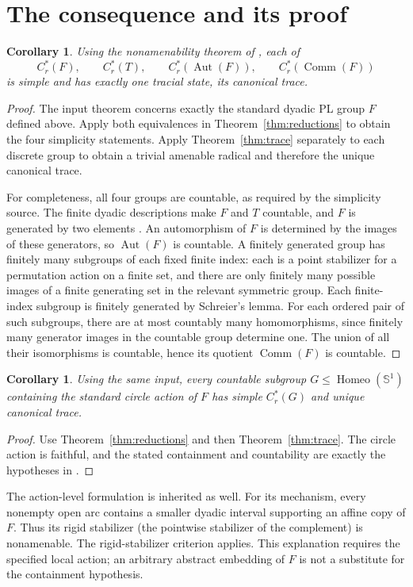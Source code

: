 \documentclass[11pt]{article}
\newtheorem{corollary}[theorem]{Corollary}
\newcommand{\Cr}{C^*_r}
\newcommand{\Aut}{\operatorname{Aut}}
\newcommand{\Comm}{\operatorname{Comm}}
\newcommand{\Homeo}{\operatorname{Homeo}}
\begin{document}
\section{The consequence and its proof}
\begin{corollary}\label{cor:main}
Using the nonamenability theorem of \cite{OAI}, each of
\[
 \Cr(F),\qquad \Cr(T),\qquad \Cr(\Aut(F)),\qquad \Cr(\Comm(F))
\]
is simple and has exactly one tracial state, its canonical trace.
\end{corollary}
\begin{proof}
The input theorem concerns exactly the standard dyadic PL group $F$ defined above. Apply both equivalences in Theorem~\ref{thm:reductions} to obtain the four simplicity statements. Apply Theorem~\ref{thm:trace} separately to each discrete group to obtain a trivial amenable radical and therefore the unique canonical trace.

For completeness, all four groups are countable, as required by the simplicity source. The finite dyadic descriptions make $F$ and $T$ countable, and $F$ is generated by two elements \cite{CFP}. An automorphism of $F$ is determined by the images of these generators, so $\Aut(F)$ is countable. A finitely generated group has finitely many subgroups of each fixed finite index: each is a point stabilizer for a permutation action on a finite set, and there are only finitely many possible images of a finite generating set in the relevant symmetric group. Each finite-index subgroup is finitely generated by Schreier's lemma. For each ordered pair of such subgroups, there are at most countably many homomorphisms, since finitely many generator images in the countable group determine one. The union of all their isomorphisms is countable, hence its quotient $\Comm(F)$ is countable.
\end{proof}

\begin{corollary}\label{cor:circle}
Using the same input, every countable subgroup $G\leq\Homeo(\mathbb S^1)$ containing the standard circle action of $F$ has simple $\Cr(G)$ and unique canonical trace.
\end{corollary}
\begin{proof}
Use Theorem~\ref{thm:reductions} and then Theorem~\ref{thm:trace}. The circle action is faithful, and the stated containment and countability are exactly the hypotheses in \cite[Theorem~4.1]{LMB}.
\end{proof}
The action-level formulation is inherited as well. For its mechanism, every nonempty open arc contains a smaller dyadic interval supporting an affine copy of $F$. Thus its rigid stabilizer (the pointwise stabilizer of the complement) is nonamenable. The rigid-stabilizer criterion \cite[Theorem~3.7]{LMB} applies. This explanation requires the specified local action; an arbitrary abstract embedding of $F$ is not a substitute for the containment hypothesis.
\end{document}
